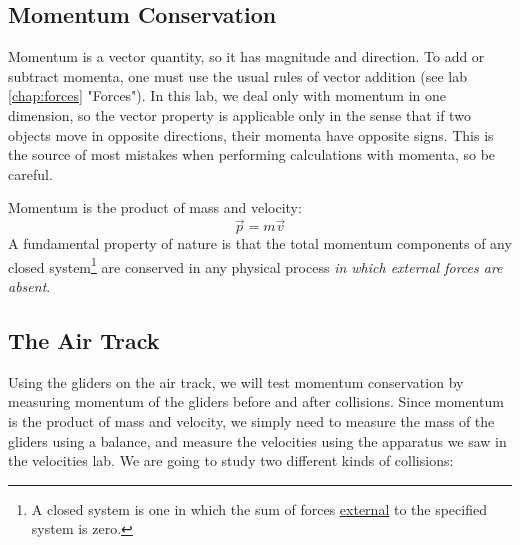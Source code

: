 \subsection{Momentum Conservation}
Momentum is a vector quantity, so it has magnitude and direction. To add or subtract momenta, one must use the usual rules of vector addition (see lab \ref{chap:forces} "Forces"). In this lab, we deal only with momentum in one dimension, so the vector property is applicable only in the sense that if two objects move in opposite directions, their momenta have opposite signs. This is the source of most mistakes when performing calculations with momenta, so be careful. \myskip

Momentum is the product of mass and velocity:
\begin{equation}
\vec p=m \vec v
\end{equation}
A fundamental property of nature is that the total momentum components of any closed system\footnote{A closed system is one in which the sum of forces \underline{external} to the specified system is zero.} are conserved in any physical process {\it{in which external forces are absent}}.
\subsection{The Air Track}

Using the gliders on the air track, we will test momentum conservation by measuring momentum of the gliders before and after collisions. Since momentum is the product of mass and velocity, we simply need to measure the mass of the gliders using a balance, and measure the velocities using the apparatus we saw in the velocities lab. We are going to study two different kinds of collisions:\myskip

